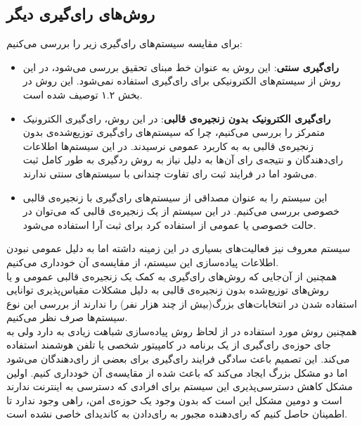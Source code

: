 \subsection{روش‌های رای‌گیری دیگر}
برای مقایسه سیستم‌های رای‌گیری زیر را بررسی می‌کنیم:
\begin{itemize}
	\item 
	\textbf{رای‌گیری سنتی}:
	این روش به عنوان خط مبنای تحقیق بررسی می‌شود، در این روش از سیستم‌های الکترونیکی برای رای‌گیری استفاده نمی‌شود. این روش در بخش ۱.۲ توصیف شده است. 
	\item \textbf{رای‌‌گیری الکترونیک بدون زنجیره‌ی قالبی}:
	در این روش، رای‌گیری الکترونیک متمرکز را بررسی می‌کنیم، چرا که سیستم‌های رای‌گیری توزیع‌شده‌ی بدون زنجیره‌ی قالبی به به کاربرد عمومی نرسیدند. در این سیستم‌ها اطلاعات رای‌دهندگان و نتیجه‌ی رای آن‌ها به دلیل نیاز به روش ردگیری به طور کامل ثبت می‌شود اما در فرایند ثبت رای تفاوت چندانی با سیستم‌های سنتی ندارند.
 	\item \textbf{}
 	این سیستم را به عنوان مصداقی از سیستم‌های رای‌گیری با زنجیره‌ی قالبی خصوصی بررسی می‌کنیم. 
 	در این سیستم از یک‌ زنجیره‌ی قالبی که می‌توان در حالت خصوصی یا عمومی از استفاده کرد برای ثبت آرا استفاده می‌شود. 
\end{itemize}
\par
 	 سیستم‌ معروف  نیز فعالیت‌های بسیاری در این زمینه داشته اما به دلیل عمومی نبودن اطلاعات پیاده‌سازی این سیستم‌، از مقایسه‌ی آن خود‌داری می‌کنیم. 
 	 \\
 	 همچنین از آن‌جایی که روش‌های رای‌گیری به کمک یک زنجیره‌ی قالبی عمومی و یا روش‌های توزیع‌شده بدون زنجیره‌ی قالبی به دلیل مشکلات مقیاس‌پذیری توانایی استفاده شدن در انتخابات‌های بزرگ(بیش از چند هزار نفر) را ندارند از بررسی این نوع سیستم‌ها صرف نظر می‌کنیم.
 	 \\
 	 همچنین روش مورد استفاده در  از لحاظ روش پیاده‌سازی شباهت زیادی به  دارد ولی به جای حوزه‌ی رای‌گیری از یک برنامه در کامپیتور شخصی یا تلفن هوشمند استفاده می‌کند. این تصمیم باعث سادگی فرایند رای‌گیری برای بعضی از رای‌دهندگان می‌شود اما دو مشکل بزرگ ایجاد می‌کند که باعث شده از مقایسه‌ی آن خودداری کنیم. اولین مشکل کاهش دسترسی‌پذیری این سیستم برای افرادی که دسترسی به اینترنت ندارند است و دومین مشکل این است که بدون وجود یک حوزه‌ی امن، راهی وجود ندارد تا اطمینان حاصل کنیم که رای‌دهنده مجبور به رای‌دادن به کاندیدای خاصی نشده است.
